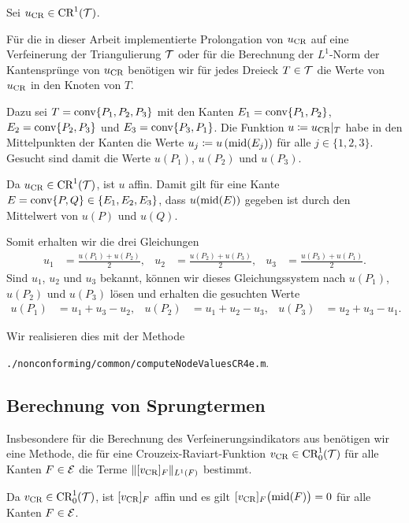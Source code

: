 Sei $u_\textup{CR}\in\textup{CR}^1(\mathcal{T})$.

Für die in dieser Arbeit implementierte Prolongation von $u_\textup{CR}$ auf eine
Verfeinerung der Triangulierung $\mathcal{T}$ oder für die Berechnung der $L^1$-Norm
der Kantensprünge von $u_\textup{CR}$ benötigen wir für jedes Dreieck $T\in\mathcal{T}$ die
Werte von $u_\textup{CR}$ in den Knoten von $T$. 

Dazu sei $T = \textup{conv}\{P_1, P_2, P_3\}$ mit den Kanten
$E_1 = \textup{conv}\{P_1,P_2\}$, $E_2 = \textup{conv}\{P_2,P_3\}$ und $E_3 =
\textup{conv}\{P_3,P_1\}$. 
Die Funktion $u\coloneqq u_\textup{CR}|_T$ habe in den Mittelpunkten der Kanten die Werte
$u_j\coloneqq u\left(\textup{mid}(E_j)\right)$ für alle $j\in\{1,2,3\}$. 
Gesucht sind damit die Werte $u(P_1)$, $u(P_2)$ und $u(P_3)$.

Da $u_\textup{CR}\in\textup{CR}^1(\mathcal{T})$, ist $u$ affin. Damit gilt für eine Kante
$E=\textup{conv}\{P,Q\}\in\{E_1,E_2,E_3\}$, dass $u(\textup{mid}(E))$ gegeben ist durch den
Mittelwert von $u(P)$ und $u(Q)$.

Somit erhalten wir die drei Gleichungen
\begin{align*}
  u_1 &= \frac{u(P_1)+u(P_2)}{2},  
  &u_2 &= \frac{u(P_2)+u(P_3)}{2},  
  &u_3 &= \frac{u(P_3)+u(P_1)}{2}.
\end{align*}
Sind $u_1$, $u_2$ und $u_3$ bekannt, können wir dieses Gleichungssystem nach 
$u(P_1)$, $u(P_2)$ und $u(P_3)$ lösen und erhalten die gesuchten Werte
\begin{align*}
 u(P_1)&=u_1+u_3-u_2, &u(P_2)&= u_1+u_2-u_3,&u(P_3)&=u_2+u_3-u_1.
\end{align*}

Wir realisieren dies mit der Methode
\begin{center}
  \texttt{./nonconforming/common/computeNodeValuesCR4e.m}.
\end{center} 

\subsection{Berechnung von Sprungtermen}

Insbesondere für die Berechnung des Verfeinerungsindikators aus
 benötigen wir eine Methode, die
für eine Crouzeix-Raviart-Funktion
$v_\textup{CR}\in\textup{CR}^1_0(\mathcal{T})$
für alle Kanten $F\in\mathcal{E}$ die Terme $\Vert [v_\textup{CR}]_F\Vert_{L^1(F)}$ 
bestimmt.

Da $v_\textup{CR}\in\textup{CR}^1_0(\mathcal{T})$, ist $[v_\textup{CR}]_F$ affin und es gilt
$[v_\textup{CR}]_F\big(\textup{mid}(F)\big)=0$ für alle Kanten $F\in\mathcal{E}$.

